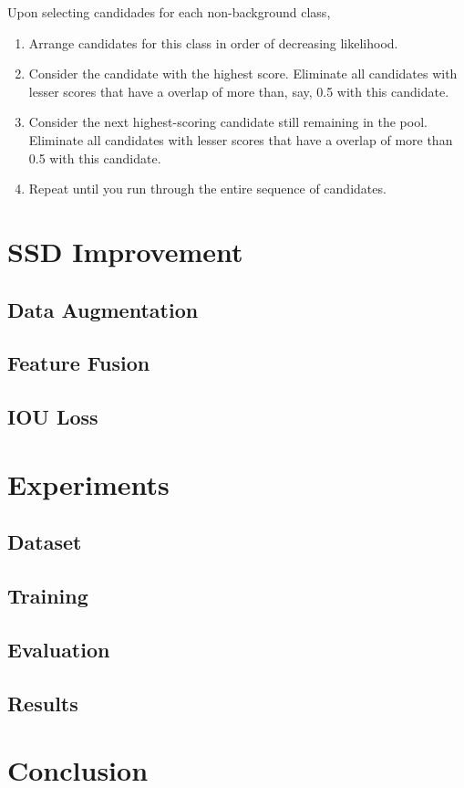 \documentclass[journal,conference]{IEEEtran}
\begin{document}
Upon selecting candidades for each non-background class,
\begin{enumerate}
  \item Arrange candidates for this class in order of decreasing likelihood.

  \item Consider the candidate with the highest score. Eliminate all candidates with lesser scores that have a overlap of more than, say, 0.5 with this candidate.

  \item Consider the next highest-scoring candidate still remaining in the pool. Eliminate all candidates with lesser scores that have a overlap of more than 0.5 with this candidate.

  \item Repeat until you run through the entire sequence of candidates.
\end{enumerate}







\section{SSD Improvement}
\subsection{Data Augmentation}

\subsection{Feature Fusion}



\subsection{IOU Loss}


\section{Experiments}
\subsection{Dataset}

\subsection{Training}

\subsection{Evaluation}

\subsection{Results}

\section{Conclusion}






\end{document}
